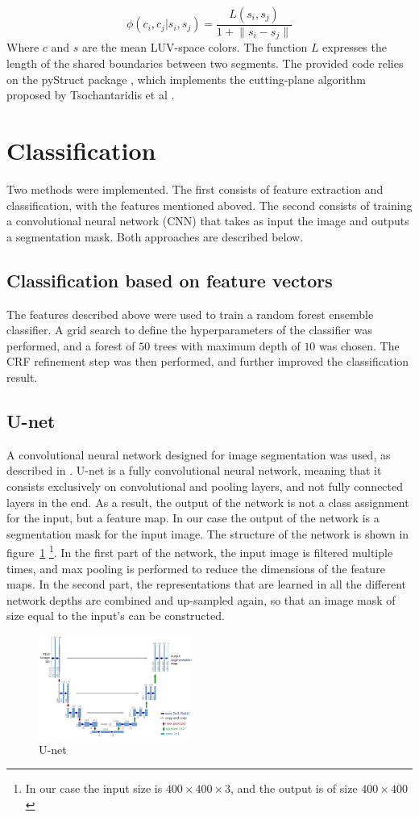 \documentclass[10pt,conference,compsocconf]{IEEEtran}
\begin{document}
 \begin{equation}
\phi(c_i,c_j|s_i,s_j) = \frac{L(s_i,s_j)}{1+\lVert s_i - s_j \rVert}
 \end{equation}
Where \(c\) and \(s\) are the mean LUV-space colors. The function \(L\) expresses the length of the shared boundaries between two segments.
The provided code relies on the pyStruct package \cite{muller14}, which implements the cutting-plane algorithm proposed by Tsochantaridis et al \cite{tsochantaridis05}.
\section{Classification}
	Two methods were implemented. The first consists of feature extraction and classification, with the features mentioned aboved. The second consists of training a convolutional neural network (CNN) that takes as input the image and outputs a segmentation mask. Both approaches are described below. 	
	
	\subsection{Classification based on feature vectors}
	The features described above were used to train a random forest ensemble classifier. A grid search to define the hyperparameters of the classifier was performed, and a forest of $50$ trees with maximum depth of $10$ was chosen.
	The CRF refinement step was then performed, and further improved the classification result.
	\subsection{U-net}
	A convolutional neural network designed for image segmentation was used, as
  described in \cite{unet}. U-net is a fully convolutional neural network,
  meaning that it consists exclusively on convolutional and pooling layers, and
  not fully connected layers in the end. As a result, the output of the network
  is not a class assignment for the input, but a feature map. In our case the
  output of the network is a segmentation mask for the input image. The
  structure of the network is shown in figure~\ref{fig:unet_arch} \footnote{In our case the input size is $400 \times 400 \times 3$, and the output is of size $400 \times 400 $}. In the first part of the network, the input image is filtered multiple times, and max pooling is performed to reduce the dimensions of the feature maps. In the second part, the representations that are learned in all the different network depths are combined and up-sampled again, so that an image mask of size equal to the input's can be constructed.
		\begin{figure}[!h]
			\centering
			\includegraphics[width=0.45\textwidth]{unet.png}
			\caption{U-net~\cite{unet}}
			\label{fig:unet_arch}
		\end{figure}
\end{document}
